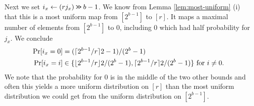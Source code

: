 Next we set $i_x\gets (rj_x)\mathbin{\texttt{>\!>}} b-1$. We know from Lemma
\ref{lem:most-uniform} (i) that this is a most uniform map from
$[2^{b-1}]$ to $[r]$.  It maps a maximal number of elements from
$[2^{b-1}]$ to $0$, including $0$ which had half probability for
$j_x$.
We conclude
\begin{align}
   \Pr[i_x=0] &= (\lceil {2^{b-1}/r}\rceil2-1)/(2^{b}-1)
   \label{eq:prix0}
   \\
   \Pr[i_x = i] &\in
   \{\lfloor {2^{b-1}/r} \rfloor2/(2^{b}-1), \lceil {2^{b-1}/r}\rceil2/(2^{b}-1)\}
   \mbox{ for $i \neq  0$}
   \label{eq:prixneq0}
   .
\end{align}
We note
that the probability for $0$ is in the middle of the two other
bounds and often this yields a more uniform distribution on $[r]$ than
the most uniform distribution we could get from the
uniform distribution on $[2^{b-1}]$.

